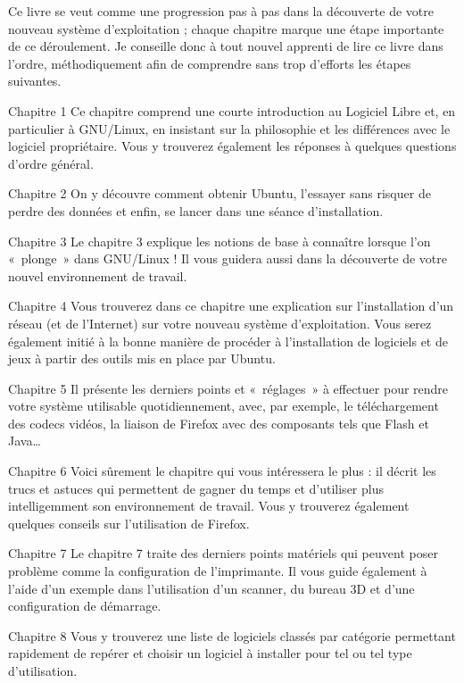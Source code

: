 Ce livre se veut comme une progression pas à pas dans la découverte de votre nouveau système d'exploitation ; chaque chapitre marque une étape importante de ce déroulement. Je conseille donc à tout nouvel apprenti de lire ce livre dans l'ordre, méthodiquement afin de comprendre sans trop d'efforts les étapes suivantes.\par
\begin{DescriptionChapitres}
\item [Chapitre 1] Ce chapitre comprend une courte introduction au Logiciel Libre et, en particulier à GNU/Linux, en insistant sur la philosophie et les différences avec le logiciel propriétaire. Vous y trouverez également les réponses à quelques questions d'ordre général.
\item [Chapitre 2] On y découvre comment obtenir Ubuntu, l'essayer sans risquer de perdre des données et enfin, se lancer dans une séance d'installation.
\item [Chapitre 3] Le chapitre 3 explique les notions de base à connaître lorsque l'on «~plonge~» dans GNU/Linux ! Il vous guidera aussi dans la découverte de votre nouvel environnement de travail.
\item [Chapitre 4] Vous trouverez dans ce chapitre une explication sur l'installation d'un réseau (et de l'Internet) sur votre nouveau système d'exploitation. Vous serez également initié à la bonne manière de procéder à l'installation de logiciels et de jeux à partir des outils mis en place par Ubuntu.
\item [Chapitre 5] Il présente les derniers points et «~réglages~» à effectuer pour rendre votre système utilisable quotidiennement, avec, par exemple, le téléchargement des codecs vidéos, la liaison de Firefox avec des composants tels que Flash et Java\ldots{}
\item [Chapitre 6] Voici sûrement le chapitre qui vous intéressera le plus : il décrit les trucs et astuces qui permettent de gagner du temps et d'utiliser plus intelligemment son environnement de travail. Vous y trouverez également quelques conseils sur l'utilisation de Firefox.
\item [Chapitre 7] Le chapitre 7 traite des derniers points matériels qui peuvent poser problème comme la configuration de l'imprimante. Il vous guide également à l'aide d'un exemple dans l'utilisation d'un scanner, du bureau 3D et d'une configuration de démarrage.
\item [Chapitre 8] Vous y trouverez une liste de logiciels classés par catégorie permettant rapidement de repérer et choisir un logiciel à installer pour tel ou tel type d'utilisation.

\end{DescriptionChapitres}
